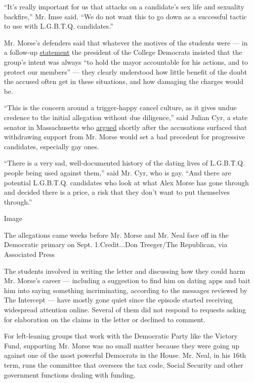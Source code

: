 ``It's really important for us that attacks on a candidate's sex life
and sexuality backfire,'' Mr. Imse said. ``We do not want this to go
down as a successful tactic to use with L.G.B.T.Q. candidates.''

Mr. Morse's defenders said that whatever the motives of the students
were --- in a follow-up
\href{https://twitter.com/CollegeDemsofMA/status/1292521048861220864/photo/1}{statement}
the president of the College Democrats insisted that the group's intent
was always ``to hold the mayor accountable for his actions, and to
protect our members'' --- they clearly understood how little benefit of
the doubt the accused often get in these situations, and how damaging
the charges would be.

``This is the concern around a trigger-happy cancel culture, as it gives
undue credence to the initial allegation without due diligence,'' said
Julian Cyr, a state senator in Massachusetts who
\href{https://twitter.com/JulianCyr/status/1293604310450950144/photo/1}{argued}
shortly after the accusations surfaced that withdrawing support from Mr.
Morse would set a bad precedent for progressive candidates, especially
gay ones.

``There is a very sad, well-documented history of the dating lives of
L.G.B.T.Q. people being used against them,'' said Mr. Cyr, who is gay.
``And there are potential L.G.B.T.Q. candidates who look at what Alex
Morse has gone through and decided there is a price, a risk that they
don't want to put themselves through.''

Image

The allegations came weeks before Mr. Morse and Mr. Neal face off in the
Democratic primary on Sept. 1.Credit...Don Treeger/The Republican, via
Associated Press

The students involved in writing the letter and discussing how they
could harm Mr. Morse's career --- including a suggestion to find him on
dating apps and bait him into saying something incriminating, according
to the messages reviewed by The Intercept --- have mostly gone quiet
since the episode started receiving widespread attention online. Several
of them did not respond to requests asking for elaboration on the claims
in the letter or declined to comment.

For left-leaning groups that work with the Democratic Party like the
Victory Fund, supporting Mr. Morse was no small matter because they were
going up against one of the most powerful Democrats in the House. Mr.
Neal, in his 16th term, runs the committee that oversees the tax code,
Social Security and other government functions dealing with funding.

